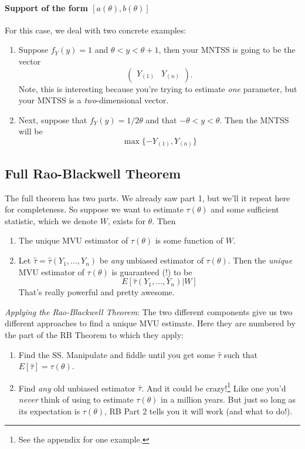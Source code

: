\documentclass[a4paper,12pt]{scrartcl}
\begin{document}
\paragraph{Support of the form $[a(\theta), b(\theta)]$} For 
this case, we deal with two concrete examples:
\begin{enumerate}
   \item Suppose $f_Y(y) = 1$ and 
      $\theta < y < \theta +1$, then your MNTSS is going to be the 
      vector
	 \[ \begin{pmatrix} Y_{(1)} & Y_{(n)} \end{pmatrix}.\]
      Note, this is interesting because you're trying to estimate 
      \emph{one} parameter, but your MNTSS is a \emph{two}-dimensional 
      vector.
   \item Next, suppose that $f_Y(y) = 1/2\theta$ and that
      $-\theta < y < \theta$. Then the MNTSS will be 
	 \[ \max\{ -Y_{(1)}, Y_{(n)}\} \]
\end{enumerate}

\subsection{Full Rao-Blackwell Theorem}

The full theorem has two parts. We already saw part 1, but we'll it
repeat here for completeness. So 
suppose we want to estimate $\tau(\theta)$
and some sufficient statistic, which we denote $W$, 
exists for $\theta$. Then
\begin{enumerate}
   \item The unique MVU estimator of $\tau(\theta)$ is some function 
      of $W$.
   \item Let $\hat{\tau} = \hat{\tau}(Y_1, \ldots, Y_n)$ be \emph{any}
      unbiased estimator of $\tau(\theta)$. Then the \emph{unique}
      MVU estimator of $\tau(\theta)$ is guaranteed (!) to be
	 \[ E\left[\hat{\tau}(Y_1, \ldots, Y_n) | W \right] \] 
      That's really powerful and pretty awesome.
\end{enumerate}
{\sl Applying the Rao-Blackwell Theorem}: The two different components
give us two different approaches to find a unique MVU estimate. Here
they are numbered by the part of the RB Theorem to which they apply:
\begin{enumerate}
   \item Find the SS. Manipulate and fiddle 
      until you get some $\hat{\tau}$ such that $E[\hat{\tau}] = 
      \tau(\theta)$. 
   \item Find \emph{any} old unbiased estimator 
      $\hat{\tau}$. And it could be crazy!\footnote{See the appendix
      for one example.} Like one you'd 
      \emph{never} think of using to estimate $\tau(\theta)$ in 
      a million years. But just so long as its expectation is 
      $\tau(\theta)$, RB Part 2 tells you it will work 
      (and what to do!).
\end{enumerate}
\end{document}
